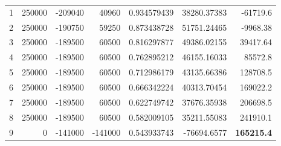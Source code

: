 \documentclass[12pt]{article}
\begin{document}
\begin{landscape}
\begin{table}[htbp]
\begin{tabular}{rrrrrrr}
    1     & 250000 & -209040 & 40960 & 0.934579439 & 38280.37383 & -61719.6 \\
    2     & 250000 & -190750 & 59250 & 0.873438728 & 51751.24465 & -9968.38 \\
    3     & 250000 & -189500 & 60500 & 0.816297877 & 49386.02155 & 39417.64 \\
    4     & 250000 & -189500 & 60500 & 0.762895212 & 46155.16033 & 85572.8 \\
    5     & 250000 & -189500 & 60500 & 0.712986179 & 43135.66386 & 128708.5 \\
    6     & 250000 & -189500 & 60500 & 0.666342224 & 40313.70454 & 169022.2 \\
    7     & 250000 & -189500 & 60500 & 0.622749742 & 37676.35938 & 206698.5 \\
    8     & 250000 & -189500 & 60500 & 0.582009105 & 35211.55083 & 241910.1 \\
    9     & 0     & -141000 & -141000 & 0.543933743 & -76694.6577 & \textbf{165215.4} \\
    \bottomrule
    \end{tabular}%
  \label{tab:addlabel}%
\end{table}%

\end{landscape}
\end{document}
